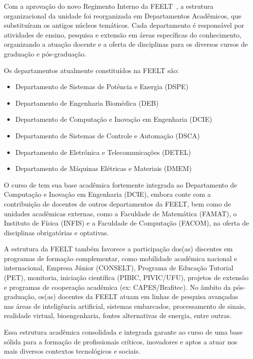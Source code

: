 Com a aprovação do novo Regimento Interno da FEELT~\cite{UFU:FEELT:Regimento:2023}, a estrutura organizacional da unidade foi reorganizada em Departamentos Acadêmicos, que substituíram os antigos núcleos temáticos. Cada departamento é responsável por atividades de ensino, pesquisa e extensão em áreas específicas do conhecimento, organizando a atuação docente e a oferta de disciplinas para os diversos cursos de graduação e pós-graduação.

Os departamentos atualmente constituídos na FEELT são:

\begin{itemize}
    \item Departamento de Sistemas de Potência e Energia (DSPE)
    \item Departamento de Engenharia Biomédica (DEB)
    \item Departamento de Computação e Inovação em Engenharia (DCIE)
    \item Departamento de Sistemas de Controle e Automação (DSCA)
    \item Departamento de Eletrônica e Telecomunicações (DETEL)
    \item Departamento de Máquinas Elétricas e Materiais (DMEM)
\end{itemize}

O curso de \ppccurso tem sua base acadêmica fortemente integrada ao Departamento de Computação e Inovação em Engenharia (DCIE), embora conte com a contribuição de docentes de outros departamentos da FEELT, bem como de unidades acadêmicas externas, como a Faculdade de Matemática (FAMAT), o Instituto de Física (INFIS) e a Faculdade de Computação (FACOM), na oferta de disciplinas obrigatórias e optativas.

A estrutura da FEELT também favorece a participação dos(as) discentes em programas de formação complementar, como mobilidade acadêmica nacional e internacional, Empresa Júnior (CONSELT), Programa de Educação Tutorial (PET), monitoria, iniciação científica (PIBIC, PIVIC/UFU), projetos de extensão e programas de cooperação acadêmica (ex: CAPES/Brafitec). No âmbito da pós-graduação, os(as) docentes da FEELT atuam em linhas de pesquisa avançadas nas áreas de inteligência artificial, sistemas embarcados, processamento de sinais, realidade virtual, bioengenharia, fontes alternativas de energia, entre outras.

Essa estrutura acadêmica consolidada e integrada garante ao curso de \ppccurso uma base sólida para a formação de profissionais críticos, inovadores e aptos a atuar nos mais diversos contextos tecnológicos e sociais.

